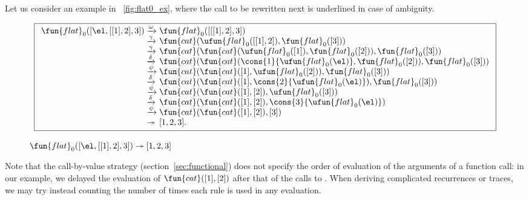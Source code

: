 Let us consider an example in \fig~\vref{fig:flat0_ex}, where the call
to be rewritten next is underlined in case of ambiguity.
\begin{figure}[t]
\begin{equation*}
\boxed{%
\begin{array}{r@{\;}l@{\;}l}
\fun{flat}_0([\el,[[1],2],3])
& \xrightarrow{\smash{\omega}}
& \fun{flat}_0([[[1],2],3])\\
& \xrightarrow{\smash{\gamma}}
& \fun{cat}(\ufun{flat}_0([[1],2]),\fun{flat}_0([3]))\\
& \xrightarrow{\smash{\gamma}}
& \fun{cat}(\fun{cat}(\ufun{flat}_0([1]),\fun{flat}_0([2])),\fun{flat}_0([3]))\\
& \xrightarrow{\smash{\delta}}
& \fun{cat}(\fun{cat}(\cons{1}{\ufun{flat}_0(\el)},\fun{flat}_0([2])),\fun{flat}_0([3]))\\
& \xrightarrow{\smash{\psi}}
& \fun{cat}(\fun{cat}([1],\ufun{flat}_0([2])),\fun{flat}_0([3]))\\
& \xrightarrow{\smash{\delta}}
& \fun{cat}(\fun{cat}([1],\cons{2}{\ufun{flat}_0(\el)}),\fun{flat}_0([3]))\\
& \xrightarrow{\smash{\psi}}
& \fun{cat}(\fun{cat}([1],[2]),\ufun{flat}_0([3]))\\
& \xrightarrow{\smash{\delta}}
& \fun{cat}(\fun{cat}([1],[2]),\cons{3}{\ufun{flat}_0(\el)})\\
& \xrightarrow{\smash{\psi}}
& \fun{cat}(\fun{cat}([1],[2]),[3])\\
& \twoheadrightarrow & [1,2,3].
\end{array}
}
\end{equation*}
\caption{\(\fun{flat}_0([\el,[[1],2],3]) \twoheadrightarrow [1,2,3]\)}
\label{fig:flat0_ex}
\end{figure}
Note that the call\hyp{}by\hyp{}value strategy (section~\ref{sec:functional}) does
not specify the order of evaluation of the arguments of a function
call: in our example, we delayed the evaluation of
\(\fun{cat}([1],[2])\)  after that of the
calls to . When
deriving complicated recurrences or traces, we may try instead
counting the number of times each rule is used in any
evaluation.


